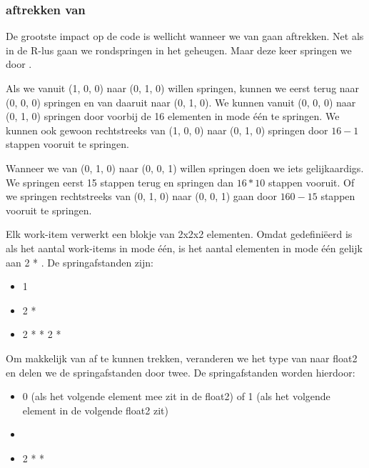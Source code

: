 \subsubsection{\TT{} aftrekken van \CC{}}
De grootste impact op de code is wellicht wanneer we \TT{} van \CC{} gaan aftrekken.  Net als in de R-lus gaan we rondspringen in het geheugen. Maar deze keer springen we door \TT{}. %

Als we vanuit (1, 0, 0) naar (0, 1, 0) willen springen, kunnen we eerst terug naar (0, 0, 0) springen en van daaruit naar (0, 1, 0). We kunnen vanuit (0, 0, 0) naar (0, 1, 0) springen door voorbij de 16 elementen in mode \'e\'en te springen. We kunnen ook gewoon rechtstreeks van (1, 0, 0) naar (0, 1, 0) springen door $16-1$ stappen vooruit te springen.

Wanneer we van (0, 1, 0) naar (0, 0, 1) willen springen doen we iets gelijkaardigs. We springen eerst 15 stappen terug en springen dan $16 * 10$ stappen vooruit. Of we springen rechtstreeks van (0, 1, 0) naar (0, 0, 1) gaan door $160 - 15$ stappen vooruit te springen.

Elk work-item verwerkt een blokje van 2x2x2 elementen. Omdat  gedefini\"eerd is als het aantal work-items in mode \'e\'en, is het aantal elementen in mode \'e\'en gelijk aan 2 * . De springafstanden zijn:
\begin{itemize}
    \item 1
    \item 2 * 
    \item 2 *  * 2 * 
\end{itemize}
Om \TT{} makkelijk van \CC{} af te kunnen trekken, veranderen we het type van \TT{} naar float2 en delen we de springafstanden door twee. De springafstanden worden hierdoor:
\begin{itemize}
	\item 0 (als het volgende element mee zit in de float2) of 1 (als het volgende element in de volgende float2 zit)
    \item {}
    \item 2 *  * 
\end{itemize}

